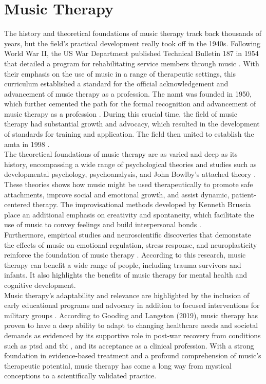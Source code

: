 \section{Music Therapy}
The history and theoretical foundations of music therapy track back thousands of years, but the field's practical development really took off in the 1940s.
Following World War II, the US War Department published Technical Bulletin 187 in 1954 that detailed a program for rehabilitating service members through music \citep{else_2014_music}.
With their emphasis on the use of music in a range of therapeutic settings, this curriculum established a standard for the official acknowledgement and advancement of music therapy as a profession.
The \gls{namt} was founded in 1950, which further cemented the path for the formal recognition and advancement of music therapy as a profession \citep{else_2014_music}.
During this crucial time, the field of music therapy had substantial growth and advocacy, which resulted in the development of standards for training and application. 
The field then united to establish the \gls{amta} in 1998 \citep{else_2014_music}.
\\
\indent The theoretical foundations of music therapy are as varied and deep as its history, encompassing a wide range of psychological theories and studies such as developmental psychology, psychoanalysis, and John Bowlby's attached theory \citep{ackerman_2018_what}.
These theories shows how music might be used therapeutically to promote safe attachments, improve social and emotional growth, and assist dynamic, patient-centered therapy. 
The improvisational methods developed by Kenneth Bruscia place an additional emphasis on creativity and spontaneity, which facilitate the use of music to convey feelings and build interpersonal bonds \citep{bruscia_1987_improvisational}.
\\
\indent Furthermore, empirical studies and neuroscientific discoveries that demonstate the effects of music on emotional regulation, stress response, and neuroplasticity reinforce the foundation of music therapy \citep{hillecke_2005_scientific}.
According to this research, music therapy can benefit a wide range of people, including trauma survivors and infants. It also highlights the benefits of music therapy for mental health and cognitive development.
\\
\indent Music therapy's adaptability and relevance are highlighted by the inclusion of early educational programs and advocacy in addition to focused interventions for military groups \citep{else_2014_music}.
According to Gooding and Langston (2019), music therapy has proven to have a deep ability to adapt to changing healthcare needs and societal demands as evidenced by its supportive role in post-war recovery from conditions such as \gls{ptsd} and \gls{tbi} \citep{gooding_2019_music}, and its acceptance as a clinical profession\citep{garrison_2021_music}.
With a strong foundation in evidence-based treatment and a profound comprehension of music's therapeutic potential, music therapy has come a long way from mystical conceptions to a scientifically validated practice.


